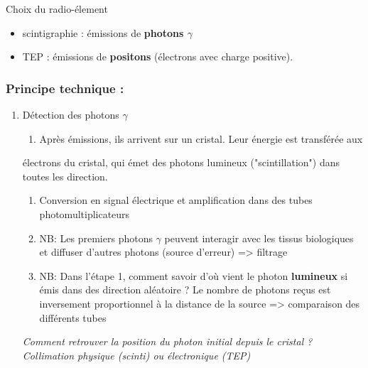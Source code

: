 \documentclass[11pt]{article}
\begin{document}
Choix du radio-élement
\begin{itemize}
\item scintigraphie : émissions de \textbf{photons \(\gamma\)}
\item TEP : émissions de \textbf{positons} (électrons avec charge positive).
\end{itemize}
\subsubsection{Principe technique :}
\label{sec:orgd70ab7a}
\begin{enumerate}
\item Détection des photons \(\gamma\)
\label{sec:org4e13b22}
\begin{enumerate}
\item Après émissions, ils arrivent sur un cristal. Leur énergie est transférée aux
\end{enumerate}
électrons du cristal, qui émet des photons lumineux ("scintillation") dans
toutes les direction.
\begin{enumerate}
\item Conversion en signal électrique et amplification dans des tubes photomultiplicateurs
\item NB: Les premiers photons \(\gamma\) peuvent interagir avec les tissus biologiques et
diffuser d'autres photons (source d'erreur) => filtrage
\item NB: Dans l'étape 1, comment savoir d'où vient le photon \textbf{lumineux} si émis
dans des direction aléatoire ? Le nombre de photons reçus est inversement
proportionnel à la distance de la source => comparaison des différents tubes
\end{enumerate}
\emph{Comment retrouver la position du photon initial depuis le cristal ? Collimation physique (scinti) ou  électronique (TEP)}


\end{enumerate}
\end{document}
